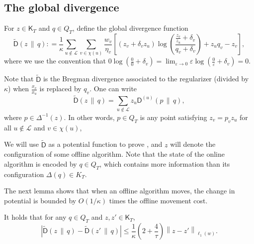 \documentclass{toc}
\newcommand{\calL}{\mathcal L}
\newcommand{\dmid}{\,\|\,}
\newcommand{\eps}{\varepsilon}
\newcommand{\seteq}{\mathrel{\mathop:}=}
\newcommand{\sfD}{\mathsf D}
\newcommand{\sfK}{\mathsf K}
\newcommand{\tilD}{\tilde{\sfD}}
\begin{document}
\subsection{The global divergence}

For $z \in \sfK_T$ and $q \in Q_T$, 
define the global divergence function
\[
\tilD(z \dmid q) \seteq \frac1{\kappa} \sum_{u \notin \calL} \sum_{v \in \chi(u)} \frac{w_v}{\eta_v} \left[ \left(z_v + \delta_v z_u\right) \log \left(\frac{\frac{z_v}{z_u}+\delta_v}{q_v+\delta_v}\right)
+ z_u q_v - z_v\right]
,
\]
where we use the convention 
that $0 \log \left(\frac{0}{0}+\delta_v\right) = \lim_{\eps \to 0} \eps \log \left(\frac{0}{\eps}+\delta_v\right) = 0$. 

Note that $\tilD$ is the Bregman divergence associated to the regularizer  (divided by $\kappa$) when $\frac{x_v}{x_{u}}$ is replaced by $q_v$. 
One can write
\[
   \tilD(z \dmid q) = \sum_{u \notin \calL} z_u\sfD^{(u)}\!\left(p \dmid q\right),
\]
where $p\in \Delta^{-1}(z)$. 
In other words, $p \in Q_T$ is any point satisfying $z_v=p_vz_u$ for all $u \notin \calL$ and $v\in\chi(u)$,

%

We will use $\tilD$ as a potential function to prove ,
and $z$ will denote the configuration of some offline algorithm.
Note that the state of the online algorithm is encoded by $q \in Q_T$, which contains
more information than its configuration $\Delta(q) \in K_T$.

The next lemma shows that when an offline algorithm moves, the change in potential is bounded by $O(1/\kappa)$ times the offline movement cost.

\begin{lemma}\label{lem:lipschitz}
	It holds that for any $q \in Q_T$ and $z,z' \in \sfK_T$,
	\[
	\left|\tilD(z \dmid q) - \tilD(z' \dmid q)\right| \leq \frac{1}{\kappa} \left(2+\frac{4}{\tau}\right) \left\|z-z'\right\|_{\ell_1(w)}.
	\]
\end{lemma}
\end{document}
